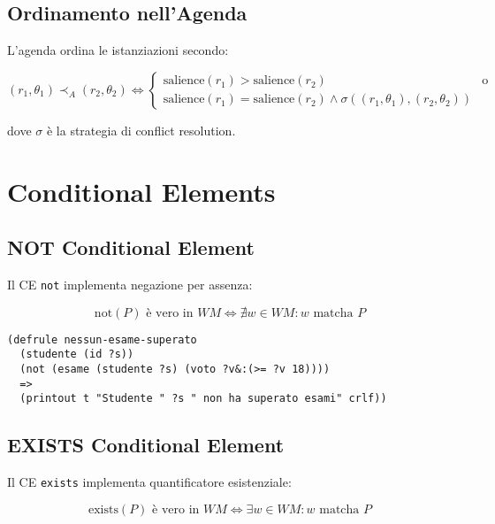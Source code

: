 \subsection{Ordinamento nell'Agenda}

L'agenda ordina le istanziazioni secondo:

\begin{equation}
(r_1, \theta_1) \prec_A (r_2, \theta_2) \Leftrightarrow 
\begin{cases}
\text{salience}(r_1) > \text{salience}(r_2) & \text{o}\\
\text{salience}(r_1) = \text{salience}(r_2) \land \sigma((r_1, \theta_1), (r_2, \theta_2)) & 
\end{cases}
\end{equation}

dove $\sigma$ è la strategia di conflict resolution.

\section{Conditional Elements}

\subsection{NOT Conditional Element}

Il CE \texttt{not} implementa negazione per assenza:

\begin{equation}
\text{not}(P) \text{ è vero in } WM \Leftrightarrow \nexists w \in WM: w \text{ matcha } P
\end{equation}

\begin{esempio}
\begin{lstlisting}[language=CLIPS]
(defrule nessun-esame-superato
  (studente (id ?s))
  (not (esame (studente ?s) (voto ?v&:(>= ?v 18))))
  =>
  (printout t "Studente " ?s " non ha superato esami" crlf))
\end{lstlisting}
\end{esempio}

\subsection{EXISTS Conditional Element}

Il CE \texttt{exists} implementa quantificatore esistenziale:

\begin{equation}
\text{exists}(P) \text{ è vero in } WM \Leftrightarrow \exists w \in WM: w \text{ matcha } P
\end{equation}

